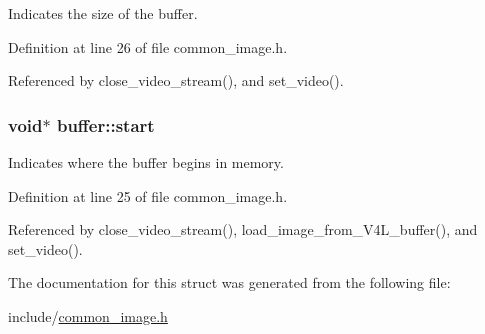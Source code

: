 \-Indicates the size of the buffer. 



\-Definition at line 26 of file common\-\_\-image.\-h.



\-Referenced by close\-\_\-video\-\_\-stream(), and set\-\_\-video().

\hypertarget{structbuffer_a8be3721dc0863d9dd7460504bbaeb0d1}{
\subsubsection[{start}]{\setlength{\rightskip}{0pt plus 5cm}void$\ast$ {\bf buffer\-::start}}}\label{structbuffer_a8be3721dc0863d9dd7460504bbaeb0d1}


\-Indicates where the buffer begins in memory. 



\-Definition at line 25 of file common\-\_\-image.\-h.



\-Referenced by close\-\_\-video\-\_\-stream(), load\-\_\-image\-\_\-from\-\_\-\-V4\-L\-\_\-buffer(), and set\-\_\-video().



\-The documentation for this struct was generated from the following file\-:\begin{DoxyCompactItemize}
\item 
include/\hyperlink{common__image_8h}{common\-\_\-image.\-h}\end{DoxyCompactItemize}
